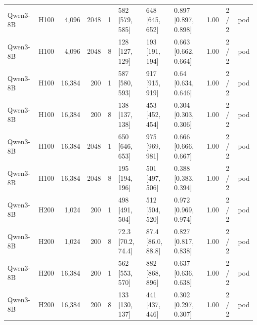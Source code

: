 \begin{landscape}
\begin{longtable}{llrrrlllrll}
Qwen3-8B & H100 & 4,096 & 2048 & 1 & 582 {[}579, 585{]} & 648 {[}645, 652{]} & 0.897 {[}0.897, 0.898{]} & 1.00 & 2 / 2 & pod \\
Qwen3-8B & H100 & 4,096 & 2048 & 8 & 128 {[}127, 129{]} & 193 {[}191, 194{]} & 0.663 {[}0.662, 0.664{]} & 1.00 & 2 / 2 & pod \\
Qwen3-8B & H100 & 16,384 & 200 & 1 & 587 {[}580, 593{]} & 917 {[}915, 919{]} & 0.64 {[}0.634, 0.646{]} & 1.00 & 2 / 2 & pod \\
Qwen3-8B & H100 & 16,384 & 200 & 8 & 138 {[}137, 138{]} & 453 {[}452, 454{]} & 0.304 {[}0.303, 0.306{]} & 1.00 & 2 / 2 & pod \\
Qwen3-8B & H100 & 16,384 & 2048 & 1 & 650 {[}646, 653{]} & 975 {[}969, 981{]} & 0.666 {[}0.666, 0.667{]} & 1.00 & 2 / 2 & pod \\
Qwen3-8B & H100 & 16,384 & 2048 & 8 & 195 {[}194, 196{]} & 501 {[}497, 506{]} & 0.388 {[}0.383, 0.394{]} & 1.00 & 2 / 2 & pod \\
Qwen3-8B & H200 & 1,024 & 200 & 1 & 498 {[}491, 504{]} & 512 {[}504, 520{]} & 0.972 {[}0.969, 0.974{]} & 1.00 & 2 / 2 & pod \\
Qwen3-8B & H200 & 1,024 & 200 & 8 & 72.3 {[}70.2, 74.4{]} & 87.4 {[}86.0, 88.8{]} & 0.827 {[}0.817, 0.838{]} & 1.00 & 2 / 2 & pod \\
Qwen3-8B & H200 & 16,384 & 200 & 1 & 562 {[}553, 570{]} & 882 {[}868, 896{]} & 0.637 {[}0.636, 0.638{]} & 1.00 & 2 / 2 & pod \\
Qwen3-8B & H200 & 16,384 & 200 & 8 & 133 {[}130, 137{]} & 441 {[}437, 446{]} & 0.302 {[}0.297, 0.307{]} & 1.00 & 2 / 2 & pod \\
\end{longtable}
\endgroup
\end{landscape}
\restoregeometry
